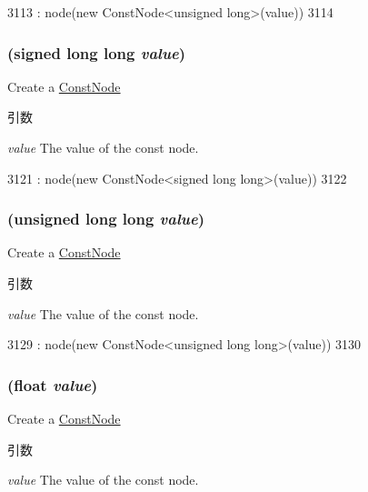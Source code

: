 \begin{DoxyCode}
3113         : node(new ConstNode<unsigned long>(value))
3114     { }
\end{DoxyCode}
\hypertarget{classStats_1_1Temp_a7a9300e968eebea58abc15bdb8917944}{
\subsubsection[{Temp}]{ (signed long long {\em value})}}
\label{classStats_1_1Temp_a7a9300e968eebea58abc15bdb8917944}
Create a \hyperlink{classStats_1_1ConstNode}{ConstNode} 
\begin{DoxyParams}{引数}
\item[{\em value}]The value of the const node. \end{DoxyParams}



\begin{DoxyCode}
3121         : node(new ConstNode<signed long long>(value))
3122     { }
\end{DoxyCode}
\hypertarget{classStats_1_1Temp_a3ee978f64b4ef52a6705f98ee4de44bf}{
\subsubsection[{Temp}]{ (unsigned long long {\em value})}}
\label{classStats_1_1Temp_a3ee978f64b4ef52a6705f98ee4de44bf}
Create a \hyperlink{classStats_1_1ConstNode}{ConstNode} 
\begin{DoxyParams}{引数}
\item[{\em value}]The value of the const node. \end{DoxyParams}



\begin{DoxyCode}
3129         : node(new ConstNode<unsigned long long>(value))
3130     { }
\end{DoxyCode}
\hypertarget{classStats_1_1Temp_a65c95538239eeb39b8b7396cff0d6224}{
\subsubsection[{Temp}]{ (float {\em value})}}
\label{classStats_1_1Temp_a65c95538239eeb39b8b7396cff0d6224}
Create a \hyperlink{classStats_1_1ConstNode}{ConstNode} 
\begin{DoxyParams}{引数}
\item[{\em value}]The value of the const node. \end{DoxyParams}



